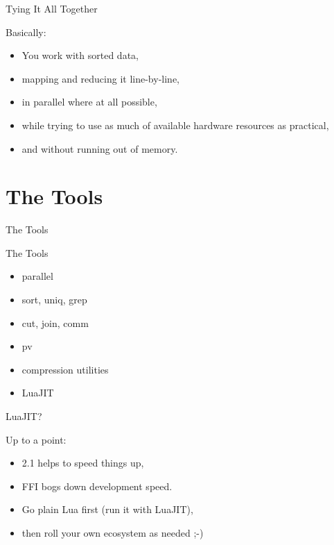 \documentclass[handout]{beamer}
\begin{document}

\begin{frame}{Tying It All Together}

Basically:
\begin{itemize}
\item You work with sorted data,
\item mapping and reducing it line-by-line,
\item in parallel where at all possible,
\item while trying to use as much of available hardware resources as practical,
\item and without running out of memory.
\end{itemize}

\end{frame}


\section{The Tools}


\begin{frame}
\huge The Tools
\end{frame}


\begin{frame}{The Tools}

\begin{itemize}
\item parallel
\item sort, uniq, grep
\item cut, join, comm
\item pv
\item compression utilities
\item LuaJIT
\end{itemize}

\end{frame}


\begin{frame}{LuaJIT?}

Up to a point:
\begin{itemize}
\item 2.1 helps to speed things up,
\item FFI bogs down development speed.
\item Go plain Lua first (run it with LuaJIT),
\item then roll your own ecosystem as needed ;-)
\end{itemize}

\end{frame}
\end{document}
